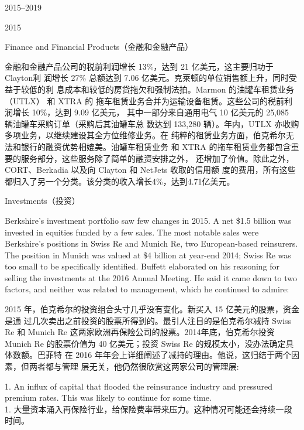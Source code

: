 \begin{chapter}{2015--2019}
\begin{section}{2015}
\begin{subsection}{Finance and Financial Products（金融和金融产品）}
\begin{verseparallel}
{    金融和金融产品公司的税前利润增长 13\%，达到 21 亿美元，这主要归功于 Clayton利
    润增长 27\% 总额达到 7.06 亿美元。克莱顿的单位销售额上升，同时受益于较低的利
    息成本和较低的房贷拖欠和强制法拍。Marmon 的油罐车租赁业务（UTLX） 和 XTRA 的
    拖车租赁业务合并为运输设备租赁。这些公司的税前利润增长 10\%，达到 9.09 亿美元，
    其中一部分来自通用电气 10 亿美元的 25,085 辆油罐车采购订单（采购后其油罐车总
    数达到 133,280 辆）。年内，UTLX 亦收购多项业务，以继续建设其全方位维修业务。在
    纯粹的租赁业务方面，伯克希尔无法和银行的融资优势相媲美。油罐车租赁业务
    和 XTRA 的拖车租赁业务都包含重要的服务部分，这些服务除了简单的融资安排之外，
    还增加了价值。除此之外，CORT、Berkadia 以及向 Clayton 和 NetJets 收取的信用额
    度的费用，所有这些都归入了另一个分类。该分类的收入增长4\%，达到4.71亿美元。

  }
\end{verseparallel}
\end{subsection}

\begin{subsection}{Investments（投资）}
\begin{verseparallel}
  {

    Berkshire's investment portfolio saw few changes in 2015. A net \$1.5
    billion was invested in equities funded by a few sales. The most notable
    sales were Berkshire’s positions in Swiss Re and Munich Re, two
    European-based reinsurers. The position in Munich was valued at \$4 billion
    at year-end 2014; Swiss Re was too small to be specifically identified.
    Buffett elaborated on his reasoning for selling the investments at the 2016
    Annual Meeting. He said it came down to two factors, and neither was
    related to management, which he continued to admire:    

  }
  {
    2015 年，伯克希尔的投资组合头寸几乎没有变化。新买入 15 亿美元的股票，资金是通
    过几次卖出之前投资的股票所得到的。最引人注目的是伯克希尔减持 Swiss
    Re 和 Munich Re 这两家欧洲再保险公司的股票。2014年底，伯克希尔投资 Munich Re
    的股票价值为 40 亿美元；投资 Swiss Re 的规模太小，没办法确定具体数额。巴菲特
    在 2016 年年会上详细阐述了减持的理由。他说，这归结于两个因素，但两者都与管理
    层无关，他仍然很欣赏这两家公司的管理层:
  }
\end{verseparallel}    

{\color{green}{此处应为列表项 \\}}

\begin{verseparallel}
  {
    1. An influx of capital that flooded the reinsurance industry and pressured
    premium rates. This was likely to continue for some time. \\
  }
  {
    1. 大量资本涌入再保险行业，给保险费率带来压力。这种情况可能还会持续一段时间。
  }
\end{verseparallel}


\end{subsection}
\end{section}
\end{chapter}
